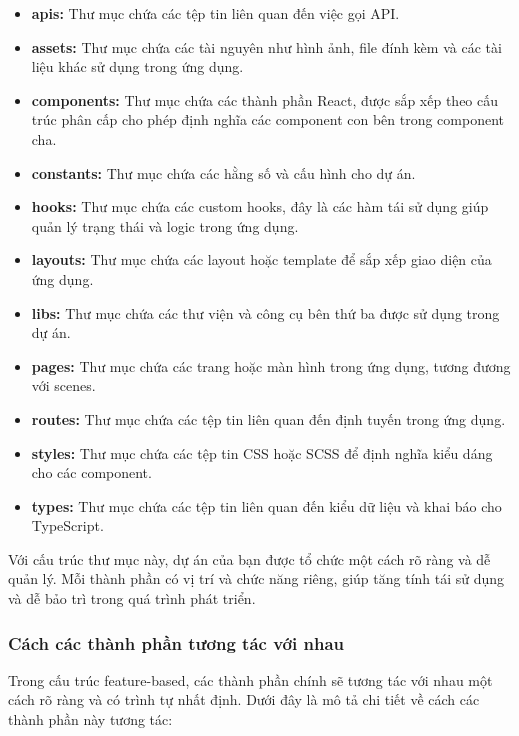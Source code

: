 \begin{itemize}
    \item \textbf{apis:} Thư mục chứa các tệp tin liên quan đến việc gọi API.
    \item \textbf{assets:} Thư mục chứa các tài nguyên như hình ảnh, file đính kèm và các tài liệu khác sử dụng trong ứng dụng.
    \item \textbf{components:} Thư mục chứa các thành phần React, được sắp xếp theo cấu trúc phân cấp cho phép định nghĩa các component con bên trong component cha.
    \item \textbf{constants:} Thư mục chứa các hằng số và cấu hình cho dự án.
    \item \textbf{hooks:} Thư mục chứa các custom hooks, đây là các hàm tái sử dụng giúp quản lý trạng thái và logic trong ứng dụng.
    \item \textbf{layouts:} Thư mục chứa các layout hoặc template để sắp xếp giao diện của ứng dụng.
    \item \textbf{libs:} Thư mục chứa các thư viện và công cụ bên thứ ba được sử dụng trong dự án.
    \item \textbf{pages:} Thư mục chứa các trang hoặc màn hình trong ứng dụng, tương đương với scenes.
    \item \textbf{routes:} Thư mục chứa các tệp tin liên quan đến định tuyến trong ứng dụng.
    \item \textbf{styles:} Thư mục chứa các tệp tin CSS hoặc SCSS để định nghĩa kiểu dáng cho các component.
    \item \textbf{types:} Thư mục chứa các tệp tin liên quan đến kiểu dữ liệu và khai báo cho TypeScript.
\end{itemize}
Với cấu trúc thư mục này, dự án của bạn được tổ chức một cách rõ ràng và dễ quản lý. Mỗi thành phần có vị trí và chức năng riêng, giúp tăng tính tái sử dụng và dễ bảo trì trong quá trình phát triển.
\subsubsection{Cách các thành phần tương tác với nhau}
Trong cấu trúc feature-based, các thành phần chính sẽ tương tác với nhau một cách rõ ràng và có trình tự nhất định. Dưới đây là mô tả chi tiết về cách các thành phần này tương tác:

